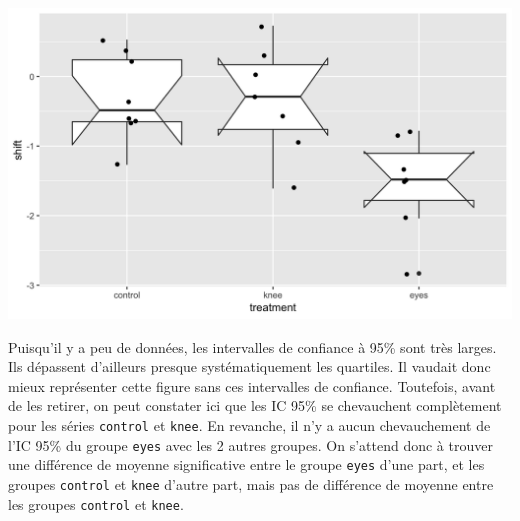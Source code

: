 \documentclass[a4paperpaper,]{article}
\newenvironment{Shaded}{\begin{snugshade}}{\end{snugshade}}
\newcommand{\DataTypeTok}[1]{\textcolor[rgb]{0.00,0.34,0.68}{#1}}
\newcommand{\FloatTok}[1]{\textcolor[rgb]{0.69,0.50,0.00}{#1}}
\newcommand{\KeywordTok}[1]{\textcolor[rgb]{0.12,0.11,0.11}{\textbf{#1}}}
\newcommand{\NormalTok}[1]{\textcolor[rgb]{0.12,0.11,0.11}{#1}}
\newcommand{\OperatorTok}[1]{\textcolor[rgb]{0.12,0.11,0.11}{#1}}
\newcommand{\StringTok}[1]{\textcolor[rgb]{0.75,0.01,0.01}{#1}}
\begin{document}
\begin{center}\includegraphics[width=0.9\linewidth]{figure/unnamed-chunk-76-1} \end{center}

Puisqu'il y a peu de données, les intervalles de confiance à 95\% sont très larges. Ils dépassent d'ailleurs presque systématiquement les quartiles. Il vaudait donc mieux représenter cette figure sans ces intervalles de confiance. Toutefois, avant de les retirer, on peut constater ici que les IC 95\% se chevauchent complètement pour les séries \texttt{control} et \texttt{knee}. En revanche, il n'y a aucun chevauchement de l'IC 95\% du groupe \texttt{eyes} avec les 2 autres groupes. On s'attend donc à trouver une différence de moyenne significative entre le groupe \texttt{eyes} d'une part, et les groupes \texttt{control} et \texttt{knee} d'autre part, mais pas de différence de moyenne entre les groupes \texttt{control} et \texttt{knee}.

\begin{Shaded}
\end{Shaded}
\end{document}
